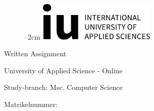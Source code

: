 \label{titlePage}
\begin{figure}[h]
\centering
\advance\leftskip--2cm
\includegraphics[width=0.50\textwidth]{pics/logo.pdf}
\end{figure}

\begin{Large} 
\begin{center}
Written Assignment
\end{center}
\end{Large} 

\vspace*{5mm}

\begin{large} 
\begin{center}
University of Applied Science - Online
\end{center}
\end{large} 

\begin{large} 
\begin{center}
Study-branch: Msc. Computer Science
\end{center}
\end{large}

\vspace*{15mm}

\begin{Large} 
\begin{center}
\textbf {\assignmentTitle}
\end{center}
\end{Large}

\vspace*{15mm}

\begin{large} 
\begin{center}
	\assignmentWriter 
\end{center}
\end{large} 

\vspace*{-6mm}

\begin{large} 
\begin{center}
Matrikelnummer: \studentNumber 
\end{center}
\end{large} 

